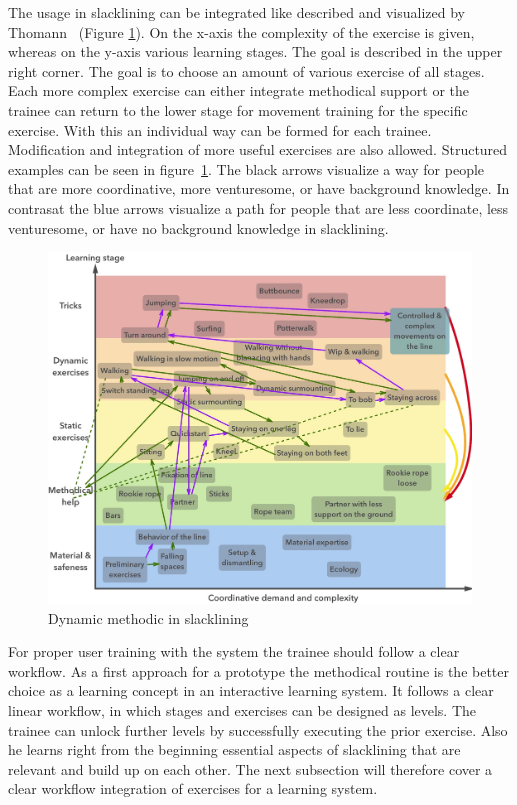 The usage in slacklining can be integrated like described and visualized by Thomann~\cite{Thomann2013-aa} (Figure \ref{fig:3_3_1_dynamicMethod}). On the x-axis the complexity of the exercise is given, whereas on the y-axis various learning stages. The goal is described in the upper right corner. The goal is to choose an amount of various exercise of all stages. Each more complex exercise can either integrate methodical support or the trainee can return to the lower stage for movement training for the specific exercise. With this an individual way can be formed for each trainee. Modification and integration of more useful exercises are also allowed. Structured examples can be seen in figure~\ref{fig:3_3_1_dynamicMethod}. The black arrows visualize a way for people that are more coordinative, more venturesome, or have background knowledge. In contrasat the blue arrows visualize a path for people that are less coordinate, less venturesome, or have no background knowledge in slacklining.

\begin{figure}[htb]
	\centering
	\begin{minipage}[t]{1\linewidth}
		\centering
		\includegraphics[width=1\linewidth]{Pictures/3_3_1_dynamicMethod3}
		\caption{Dynamic methodic in slacklining~\cite{Thomann2013-aa}}
		\label{fig:3_3_1_dynamicMethod}
	\end{minipage}
\end{figure}

For proper user training with the system the trainee should follow a clear workflow. As a first approach for a prototype the methodical routine is the better choice as a learning concept in an interactive learning system. It follows a clear linear workflow, in which stages and exercises can be designed as levels. The trainee can unlock further levels by successfully executing the prior exercise. Also he learns right from the beginning essential aspects of slacklining that are relevant and build up on each other. 
The next subsection \textit{} will therefore cover a clear workflow integration of exercises for a learning system.

